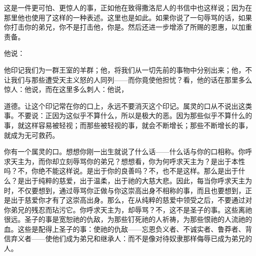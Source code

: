 这是一件更可怕、更惊人的事，正如他在致得撒洛尼人的书信中也这样说；因为在那里他也使用了这样的一种表述。这里也是如此。如果你说了一句辱骂的话，如果你打击你的弟兄，你不是打击他，你是。然后还进一步增添了所赐的恩惠，以加重责备。\par

他说：\par

他印记我们为一群王室的羊群；他，将我们从一切先前的事物中分别出来；他，不让我们与那些遭受天主义怒的人同列——而你竟使他担忧？看，他的话在那里多么惊人：他说，而在这里多么刺人：他说，\par

道德。让这个印记常在你的口上，永远不要消灭这个印记。属灵的口从不说出这类事。不要说：正因为这似乎不算什么，所以是极大的恶。因为那些似乎不算什么的事，就这样容易被轻视；而那些被轻视的事，就会不断增长；那些不断增长的事，就成为无可救药。\par

你有一个属灵的口。想想你刚一出生就说了什么话——什么话与你的口相称。你呼求天主为，而你却立刻辱骂你的弟兄？想想看，你为何呼求天主为？是出于本性吗？不，你绝不能这样说。是出于你的良善吗？不，也不是这样。那么是出于什么？是出于纯粹的慈爱，出于温柔，出于祂的大慈大悲。因此，每当你呼求天主为时，不仅要想到，通过辱骂你正做与你这崇高出身不相称的事，而且也要想到，正是出于慈爱你才有了这崇高出身。那么，在从纯粹的慈爱中领受之后，不要通过对你弟兄的残忍而玷污它。你呼求天主为，却辱骂？不，这不是圣子的事。这些离祂很远。圣子的事是宽恕祂的仇敌，为那些钉死祂的人祈祷，为那些恨祂的人流祂的血。这些是配得上圣子的事：使祂的仇敌——忘恩负义者、不诚实者、鲁莽者、背信弃义者——使他们成为弟兄和继承人：而不是像对待奴隶那样侮辱已成为弟兄的人。\par

